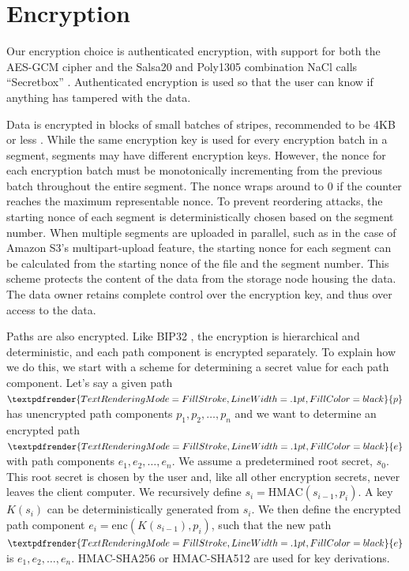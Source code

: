 \documentclass[8pt,fleqn,openany]{book}
\newcommand{\semibold}[1]{\textpdfrender{TextRenderingMode=FillStroke,LineWidth=.1pt,FillColor=black}{#1}}
\begin{document}
\section{Encryption}\label{sec:concrete-encryption}

Our encryption choice is authenticated encryption, with support for both the
AES-GCM cipher and the Salsa20 and Poly1305 combination NaCl calls ``Secretbox''
\cite{nacl-crypto}. Authenticated encryption is used so that the user can know
if anything has tampered with the data.

Data is encrypted in blocks of small batches of stripes, recommended to be
4KB or less \cite{nacl-packetlen}. While the same encryption key is used for
every encryption batch in a segment, segments may have
different encryption keys. However, the nonce for each encryption
batch must be monotonically incrementing from the previous batch throughout the
entire segment. The nonce wraps around to 0 if the counter reaches the
maximum representable nonce.
To prevent reordering attacks, the starting nonce of each
segment is deterministically chosen based on the segment number.
When multiple segments are uploaded in parallel, such as in the case of
Amazon S3's multipart-upload feature, the starting nonce for each segment can be
calculated from the starting nonce of the file and the segment number.
This scheme protects the
content of the data from the storage node housing the data. The data owner
retains complete control over the encryption key, and thus over access to the
data.


Paths are also encrypted. Like
BIP32 \cite{bip32}, the encryption is hierarchical and deterministic, and
each path component is encrypted separately. To explain how we do this,
we start with a scheme for determining a secret value for each path
component.
Let's say a given path $\semibold{p}$ has unencrypted path components
$p_1, p_2, \ldots, p_n$
and we want to determine an encrypted path $\semibold{e}$ with path components
$e_1, e_2, \ldots, e_n$.
We assume a predetermined root secret, $s_0$. This root secret is chosen
by the user and, like all other encryption secrets, never leaves the client
computer. We recursively define
$s_i = \mbox{HMAC}(s_{i-1}, p_i)$.
A key $K(s_i)$ can be deterministically generated from $s_i$.
We then define the encrypted path component
$e_i = \mbox{enc}(K(s_{i-1}), p_i)$, such that the new path
$\semibold{e}$ is $e_1, e_2, \ldots, e_n$.
HMAC-SHA256 or HMAC-SHA512 are used for key derivations.
\end{document}
